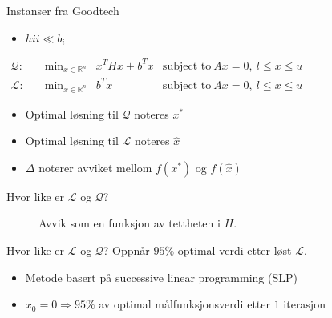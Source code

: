 \documentclass{beamer}
\begin{document}
\begin{frame}{Instanser fra Goodtech}
\begin{itemize}
\item $hii \ll b_i$
\end{itemize}
$
\begin{array}{llrl}
\mathcal{Q}: \quad & \min_{x \in \mathbb{R}^n} & x^T H x + b^T x & \textrm{subject to} ~ Ax = 0, ~ l \leq x \leq u \\
\mathcal{L}: \quad & \min_{x \in \mathbb{R}^n} & b^T x & \textrm{subject to} ~ Ax = 0, ~ l \leq x \leq u
\end{array}
$
\begin{itemize}
\item Optimal løsning til $\mathcal{Q}$ noteres $x^*$
\item Optimal løsning til $\mathcal{L}$ noteres $\hat{x}$
\item $\Delta$ noterer avviket mellom $f(x^*)$ og $f(\hat{x})$
\end{itemize}
\end{frame}



\begin{frame}{Hvor like er $\mathcal{L}$ og $\mathcal{Q}$?}
\begin{figure}[ht!]

\caption{Avvik som en funksjon av tettheten i $H$.}
\end{figure}
\end{frame}



\begin{frame}{Hvor like er $\mathcal{L}$ og $\mathcal{Q}$?}
Oppnår $95\%$ optimal verdi etter løst $\mathcal{L}$.
\begin{itemize}
\item Metode basert på successive linear programming (SLP)
\item $x_0 = 0 \Rightarrow 95\%$ av optimal målfunksjonsverdi etter $1$ iterasjon
\end{itemize}
\end{frame}



%
\end{document}
